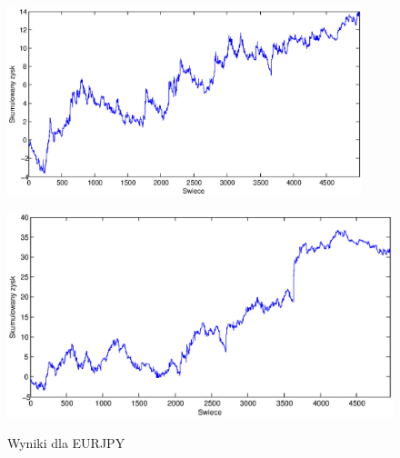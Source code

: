 \begin{figure}[h]
\begin{minipage}{.49\linewidth}
\label{cztero}
\end{minipage}
\begin{minipage}{.49\linewidth}
\centering
\includegraphics[width=0.92\textwidth]{images/S1d_eurjpy.eps}
\label{mansard}
\end{minipage}
\begin{minipage}{\linewidth}
\centering
\includegraphics[width=\textwidth]{images/S1s_eurjpy.eps}
\label{mansard}
\end{minipage}
\caption{Wyniki dla EURJPY}
\end{figure}
\FloatBarrier

